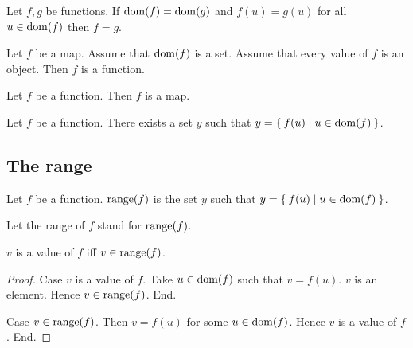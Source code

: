 \documentclass[../../set-theory.ftl.tex]{subfiles}
\begin{document}
  \begin{forthel}
    \begin{axiom}\label{SetTheory_02_01_200419}
      Let $f,g$ be functions.
      If $\operatorname{dom}(f) = \operatorname{dom}(g)$ and $f(u) = g(u)$ for all $u \in \operatorname{dom}(f)$ then $f = g$.
    \end{axiom}



    \begin{axiom}
      Let $f$ be a map.
      Assume that $\operatorname{dom}(f)$ is a set.
      Assume that every value of $f$ is an object.
      Then $f$ is a function.
    \end{axiom}

    \begin{axiom}
      Let $f$ be a function.
      Then $f$ is a map.
    \end{axiom}


    \begin{axiom}[Replacement]\label{SetTheory_02_01_297906}
      Let $f$ be a function.
      There exists a set $y$ such that $y = \Set{f(u) | u \in \operatorname{dom}(f)}$.
    \end{axiom}
  \end{forthel}


  \subsection{The range}

  \begin{forthel}
    \begin{definition}
      Let $f$ be a function.
      $\operatorname{range}(f)$ is the set $y$ such that $y = \Set{f(u) | u \in \operatorname{dom}(f)}$.
    \end{definition}

    Let the range of $f$ stand for $\operatorname{range}(f)$.


    \begin{proposition}\label{SetTheory_02_01_324423}
      $v$ is a value of $f$ iff $v \in \operatorname{range}(f)$.
    \end{proposition}
    \begin{proof}
      Case $v$ is a value of $f$.
        Take $u \in \operatorname{dom}(f)$ such that $v = f(u)$.
        $v$ is an element.
        Hence $v \in \operatorname{range}(f)$.
      End.

      Case $v \in \operatorname{range}(f)$.
        Then $v = f(u)$ for some $u \in \operatorname{dom}(f)$.
        Hence $v$ is a value of $f$.
      End.
    \end{proof}
  \end{forthel}
\end{document}
